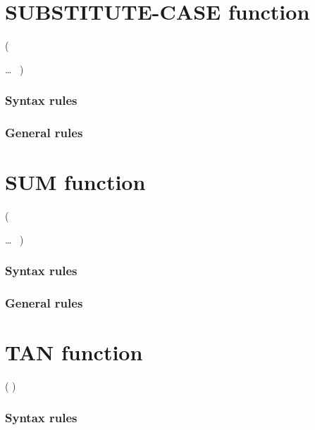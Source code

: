 \section{SUBSTITUTE-CASE function}

\begin{syntax}[\gnucobolcolour]
    ( \argument
  \begin{1=}
    \argument \argument
  \end{1=}\ldots\ {}
  )
\end{syntax}

\subsubsection{Syntax rules}

\subsubsection{General rules}

\section{SUM function}

\begin{syntax}
    (
  \begin{1=}
    \argument
  \end{1=}\ldots
  \ {})
\end{syntax}

\subsubsection{Syntax rules}

\subsubsection{General rules}

\section{TAN function}

\begin{syntax}
    ( \argument )
\end{syntax}

\subsubsection{Syntax rules}

